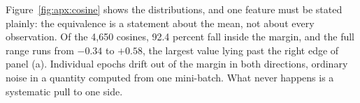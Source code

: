 Figure~\ref{fig:apx:cosine} shows the distributions, and one feature must be stated plainly: the
equivalence is a statement about the mean, not about every observation.
Of the 4,650 cosines, 92.4
percent fall inside the margin, and the full range runs from $-0.34$ to $+0.58$, the largest value
lying past the right edge of panel (a). Individual epochs drift out of the margin in both
directions, ordinary noise in a quantity computed from one mini-batch. What never happens is a
systematic pull to one side.

